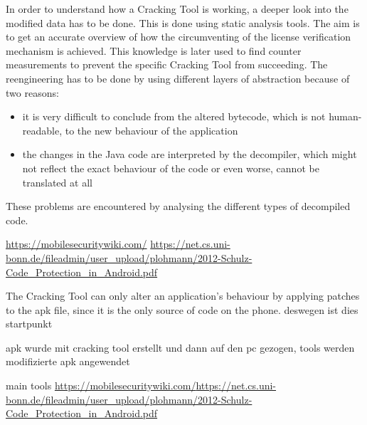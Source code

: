 In order to understand how a Cracking Tool is working, a deeper look into the modified data has to be done. This is done using static analysis tools. The aim is to get an accurate overview of how the circumventing of the license verification mechanism is achieved. This knowledge is later used to find counter measurements to prevent the specific Cracking Tool from succeeding.\newline
The reengineering has to be done by using different layers of abstraction because of two reasons:
\begin{itemize}
\item it is very difficult to conclude from the altered bytecode, which is not human-readable, to the new behaviour of the application
\item the changes in the Java code are interpreted by the decompiler, which might not reflect the exact behaviour of the code or even worse, cannot be translated at all
\end{itemize}
These problems are encountered by analysing the different types of decompiled code.

\url{https://mobilesecuritywiki.com/}\newline
\url{https://net.cs.uni-bonn.de/fileadmin/user_upload/plohmann/2012-Schulz-Code_Protection_in_Android.pdf}\newline



The Cracking Tool can only alter an application's behaviour by applying patches to the \gls{apk} file, since it is the only source of code on the phone.\newline
deswegen ist dies startpunkt


apk wurde mit cracking tool erstellt und dann auf den pc gezogen, tools werden modifizierte apk angewendet

main tools\newline
\url{https://mobilesecuritywiki.com/}\newline \url{https://net.cs.uni-bonn.de/fileadmin/user_upload/plohmann/2012-Schulz-Code_Protection_in_Android.pdf}\newline
